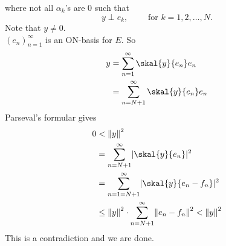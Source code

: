 \begin{beweis}
\begin{description}
\[		\]
		where not all $\alpha_k$'s are $0$ such that
		\[
			y \perp e_k, \qquad \text{ for }k =1,2,\dots,N.
		\]
		Note that $y \neq 0$. \\
		$(e_n)_{n=1}^{\infty}$ is an ON-basis for $E$. So
		\begin{align*}
		y &= \sum_{n=1}^{\infty} \skal{y }{e_n}e_n  \\
		&= \sum_{n=N+1}^{\infty} \skal{y}{e_n}e_n 
		\end{align*}
		Parseval's formular gives
		\begin{align*}
			0	&< \norm{y}^2 \\ &= \sum_{n=N+1}^{\infty}\abs{\skal{y}{e_n}}^2 \\
			&= \sum_{n=1=N+1}^{\infty}\abs{\skal{y}{e_n-f_n}}^2 \\
			&\leq \norm{y}^2 \cdot \sum_{n=N+1}^{\infty} \norm{e_n-f_n}^2 < \norm{y}^2
		\end{align*}
		This is a contradiction and we are done.
	\end{description}
\end{beweis}